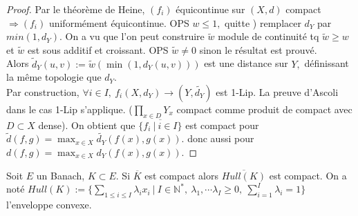 \begin{proof}
    Par le théorème de Heine, $(f_i)$ équicontinue sur $(X,d)$ compact $\Rightarrow (f_i)$ uniformément équicontinue. OPS $w\le 1,$ quitte ) remplacer $d_Y$ par $min(1,d_Y).$ On a vu que l'on peut construire $\tilde{w}$ module de continuité tq $\tilde{w}\ge w$ et $\tilde{w}$ est sous additif et croissant. OPS $\tilde{w}\neq 0$ sinon le résultat est prouvé. \\
    Alors $\tilde{d}_Y(u,v):=\tilde{w}(\min(1,d_Y(u,v)))$ est une distance sur $Y,$ définissant la même topologie que $d_Y$.\\
    Par construction, $\forall i\in I,\ f_i(X,d_Y)\to (Y,\tilde{d_{Y}}) $ est 1-Lip. La preuve d'Ascoli dans le cas 1-Lip s'applique. ($\prod\limits_{x\in D}^{}Y_x$ compact comme produit de compact avec $D\subset X$ dense). On obtient  que $\overline{\{f_i\ |\ i\in I\} }$ est compact pour $\tilde{d}(f,g)=\max_{x\in X}\tilde{d_Y}(f(x),g(x)).$ donc aussi pour  $d(f,g)=\max_{x\in X}d_Y(f(x),g(x)).$
\end{proof}
\begin{propriete}
    Soit $E$ un Banach, $K\subset E.$ Si $\overline{K}$ est compact alors $\overline{Hull(K)}$ est compact. On a noté $Hull(K):=\{\sum\limits_{1\le i\le I}^{} \lambda_ix_i\ |\ I\in \mathbb{N} ^*,\ \lambda_1,\cdots\lambda_I\ge 0,\ \sum\limits_{i=1}^{I} \lambda_i=1\} $ l'enveloppe convexe.
\end{propriete}
